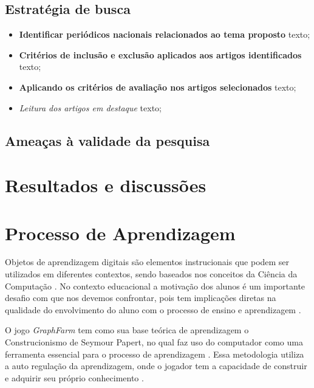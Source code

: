 \documentclass[10pt, conference, compsocconf]{IEEEtran}
\begin{document}
\subsection{Estratégia de busca}

\begin{itemize}
	
	\item \textbf{Identificar periódicos nacionais relacionados ao tema proposto } texto;
	
	\item \textbf{Critérios de inclusão e exclusão aplicados aos artigos identificados} texto;
	
	\item \textbf{Aplicando os critérios de avaliação nos artigos selecionados} texto;
	
	\item \textit{Leitura dos artigos em destaque} texto;
	
	
\end{itemize}

\subsection{Ameaças à validade da pesquisa}

\section{Resultados e discussões}



\section{Processo de Aprendizagem}

Objetos de aprendizagem digitais são elementos instrucionais que podem ser utilizados em diferentes contextos, sendo baseados nos conceitos da Ciência da Computação \cite{denning2009beyond}. No contexto educacional a motivação dos alunos é um importante desafio com que nos devemos confrontar, pois tem implicações diretas na qualidade do envolvimento do aluno com o processo de ensino e aprendizagem \cite{lourencco2010motivaccao}.

O jogo \textit{GraphFarm} tem como sua base teórica de aprendizagem o Construcionismo de Seymour Papert, no qual faz uso do computador como uma ferramenta essencial para o processo de aprendizagem \cite{papert1994maquina}. Essa metodologia utiliza a auto regulação da aprendizagem, onde o jogador tem a capacidade de construir e adquirir seu próprio conhecimento \cite{alencar2019looking}.
\end{document}
